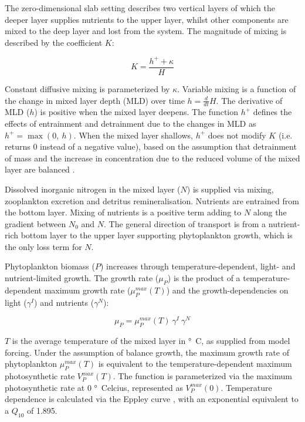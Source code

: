 \documentclass[journal abbreviation, manuscript]{copernicus}
\begin{document}
The zero-dimensional slab setting describes two vertical layers of which the deeper layer supplies nutrients to the upper layer, whilst other components are mixed to the deep layer and lost from the system.
The magnitude of mixing is described by the coefficient $K$:

\begin{equation}
    K = \frac{h^{+} + \kappa}{H}
\end{equation}

Constant diffusive mixing is parameterized by $\kappa$. Variable mixing is a function of the change in mixed layer depth (MLD) over time $h = \frac{d}{d t} H$. The derivative of MLD ($h$) is positive when the mixed layer deepens. The function $h^{+}$ defines the effects of entrainment and detrainment due to the changes in MLD as $h^{+} = \max(0, \ h)$. When the mixed layer shallows, $h^{+}$ does not modify $K$ (i.e. returns 0 instead of a negative value), based on the assumption that detrainment of mass and the increase in concentration due to the reduced volume of the mixed layer are balanced \citep{Evans1985ACycles}. 

Dissolved inorganic nitrogen in the mixed layer ($N$) is supplied via mixing, zooplankton excretion and detritus remineralisation.
Nutrients are entrained from the bottom layer. Mixing of nutrients is a positive term adding to $N$ along the gradient between $N_0$ and $N$. The general direction of transport is from a nutrient-rich bottom layer to the upper layer supporting phytoplankton growth, which is the only loss term for $N$.

Phytoplankton biomass ($P$) increases through temperature-dependent, light- and nutrient-limited growth. The growth rate ($\mu_{P}$) is the product of a temperature-dependent maximum growth rate ($\mu_P^{max}(T)$) and the growth-dependencies on light ($\gamma^{I}$) and nutrients ($\gamma^{N}$): 

\begin{equation}
    \mu_{P} = \mu_P^{max}(T) \ \gamma^{I} \ \gamma^{N}
\end{equation}

$T$ is the average temperature of the mixed layer in \unit{\degree C}, as supplied from model forcing. Under the assumption of balance growth, the maximum growth rate of phytoplankton $\mu_P^{max}(T)$ is equivalent to the temperature-dependent maximum photosynthetic rate $V_P^{max}(T)$. The function is parameterized via the maximum photosynthetic rate at 0 \unit{\degree Celcius}, represented as $V_P^{max}(0)$. Temperature dependence is calculated via the Eppley curve \citep{Eppley1972TemperatureSea}, with an exponential equivalent to a $Q_{10}$ of 1.895.
\end{document}
